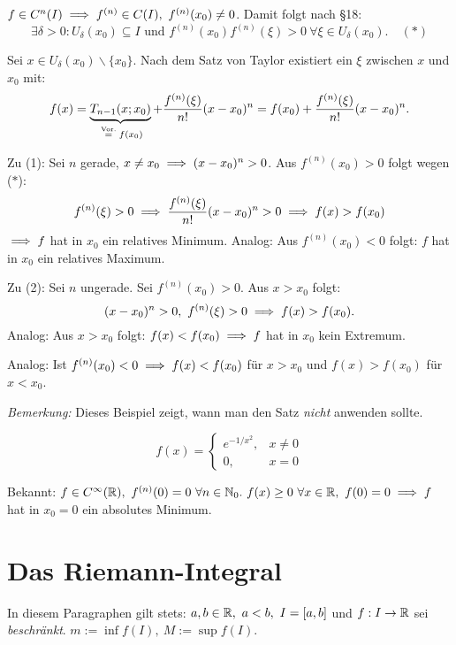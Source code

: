 \documentclass[a4paper,oneside,DIV15,BCOR12mm]{scrbook}
\begin{document}
\begin{beweis}
$f \in C^n(I) \folgt f^{(n)} \in C(I),\ f^{(n)}(x_0) \ne 0$. Damit folgt nach §18:
$$\exists \delta > 0: U_\delta(x_0) \subseteq I\text{ und }f^{(n)}(x_0) f^{(n)}(\xi) > 0\ \forall \xi \in U_\delta(x_0).\quad(*)$$

Sei $x\in U_\delta(x_0)\backslash \{x_0\}$. Nach dem Satz von Taylor existiert ein $\xi$ zwischen $x$ und $x_0$ mit:
$$f(x) = \underbrace{T_{n-1}(x;x_0)}_{\gleichnach{Vor.} f(x_0)} + \frac{f^{(n)}(\xi)}{n!}(x-x_0)^n = f(x_0) + \frac{f^{(n)}(\xi)}{n!}(x-x_0)^n.$$

Zu (1): Sei $n$ gerade, $x \ne x_0 \implies (x-x_0)^n > 0$. Aus $f^{(n)}(x_0) > 0$ folgt wegen ($*$):
$$f^{(n)}(\xi) > 0 \implies \frac{f^{(n)}(\xi)}{n!}(x-x_0)^n > 0 \implies f(x) > f(x_0)$$
$\implies f$ hat in $x_0$ ein relatives Minimum. Analog: Aus $f^{(n)}(x_0) < 0$ folgt: $f$ hat in $x_0$ ein relatives Maximum.

Zu (2): Sei $n$ ungerade. Sei $f^{(n)}(x_0) > 0$. Aus $x > x_0$ folgt:
$$(x-x_0)^n > 0,\ f^{(n)}(\xi) > 0 \implies f(x) > f(x_0).$$
Analog: Aus $x > x_0$ folgt: $f(x) < f(x_0) \implies f$ hat in $x_0$ kein Extremum.

Analog: Ist $f^{(n)}(x_0) < 0 \implies f(x) < f(x_0)$ für $x > x_0$ und $f(x) > f(x_0)$ für $x < x_0$.
\end{beweis}

\begin{beispiel}
\emph{Bemerkung:} Dieses Beispiel zeigt, wann man den Satz \emph{nicht} anwenden sollte.

$$f(x) = \begin{cases}
e^{-1/x^2},& x \ne 0\\
0,& x=0
\end{cases}$$

Bekannt: $f \in C^\infty(\mathbb{R}),\ f^{(n)}(0) = 0\ \forall n \in \mathbb{N}_0.\ f(x) \ge 0\ \forall x \in \mathbb{R},\ f(0) = 0 \implies f$ hat in $x_0 = 0$ ein absolutes Minimum.
\end{beispiel}


\theoremstyle{nonumberbreak}
\newtheorem{merkregel}{Merkregel}

\chapter{Das Riemann-Integral}

In diesem Paragraphen gilt stets: $a,b \in \mathbb{R},\ a<b,\ I = [a,b]$ und $f: I \to \mathbb{R}$ sei \emph{beschränkt}. $m := \inf f(I),\ M := \sup f(I)$.
\end{document}

